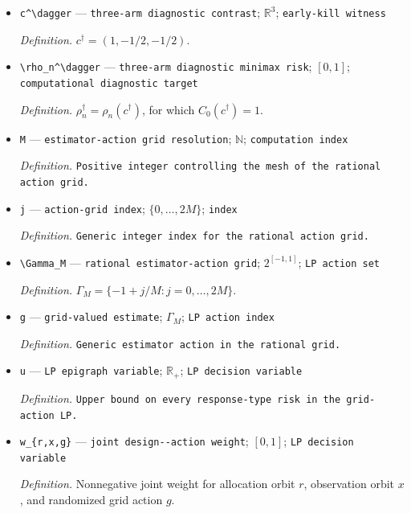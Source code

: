\documentclass{article}
\begin{document}
\begin{itemize}
  \item \texttt{c\textasciicircum{}\textbackslash{}\allowbreak{}dagger} --- \texttt{three-\allowbreak{}arm diagnostic contrast}; \(\mathbb R^3\); \texttt{early-\allowbreak{}kill witness}
  \par\smallskip\noindent\emph{Definition.} \(c^\dagger=(1,-1/2,-1/2)\).
  \item \texttt{\textbackslash{}\allowbreak{}rho\_\allowbreak{}n\textasciicircum{}\textbackslash{}\allowbreak{}dagger} --- \texttt{three-\allowbreak{}arm diagnostic minimax risk}; \([0,1]\); \texttt{computational diagnostic target}
  \par\smallskip\noindent\emph{Definition.} \(\rho_n^\dagger=\rho_n(c^\dagger)\), for which \(C_0(c^\dagger)=1\).
  \item \texttt{M} --- \texttt{estimator-\allowbreak{}action grid resolution}; \(\mathbb N\); \texttt{computation index}
  \par\smallskip\noindent\emph{Definition.} \texttt{Positive integer controlling the mesh of the rational action grid.}
  \item \texttt{j} --- \texttt{action-\allowbreak{}grid index}; \(\{0,\ldots,2M\}\); \texttt{index}
  \par\smallskip\noindent\emph{Definition.} \texttt{Generic integer index for the rational action grid.}
  \item \texttt{\textbackslash{}\allowbreak{}Gamma\_\allowbreak{}M} --- \texttt{rational estimator-\allowbreak{}action grid}; \(2^{[-1,1]}\); \texttt{LP action set}
  \par\smallskip\noindent\emph{Definition.} \(\Gamma_M=\{-1+j/M:j=0,\ldots,2M\}\).
  \item \texttt{g} --- \texttt{grid-\allowbreak{}valued estimate}; \(\Gamma_M\); \texttt{LP action index}
  \par\smallskip\noindent\emph{Definition.} \texttt{Generic estimator action in the rational grid.}
  \item \texttt{u} --- \texttt{LP epigraph variable}; \(\mathbb R_+\); \texttt{LP decision variable}
  \par\smallskip\noindent\emph{Definition.} \texttt{Upper bound on every response-\allowbreak{}type risk in the grid-\allowbreak{}action LP.}
  \item \texttt{w\_\allowbreak{}\{r,\allowbreak{}x,\allowbreak{}g\}\allowbreak{}} --- \texttt{joint design-\allowbreak{}-\allowbreak{}action weight}; \([0,1]\); \texttt{LP decision variable}
  \par\smallskip\noindent\emph{Definition.} Nonnegative joint weight for allocation orbit \(r\), observation orbit \(x\), and randomized grid action \(g\).

\end{itemize}
\end{document}
